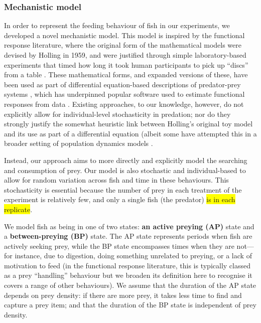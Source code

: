 \documentclass[ASNA,twocolumn]{USG} %
\begin{document}
\subsubsection{Mechanistic model}
In order to represent the feeding behaviour of fish in our experiments, we developed a novel mechanistic model. This model is inspired by the functional response literature, where the original form of the mathematical models were devised by Holling in 1959, and were justified through simple laboratory-based experiments that timed how long it took human participants to pick up ``discs'' from a table \citep{hollingCharacteristicsSimpleTypes1959}. These mathematical forms, and expanded versions of these, have been used as part of differential equation-based descriptions of predator-prey systems \citep{rosenbaumFittingFunctionalResponses2018a}, which has underpinned popular software used to estimate functional responses from data \citep[e.g.][]{pritchardFrairPackageFitting2017}. Existing approaches, to our knowledge, however, do not explicitly allow for individual-level stochasticity in predation; nor do they strongly justify the somewhat heuristic link between Holling's original toy model and its use as part of a differential equation (albeit some have attempted this in a broader setting of population dynamics models \citep{dawesDerivationHollingsType2013}.

Instead, our approach aims to more directly and explicitly model the searching and consumption of prey. Our model is also stochastic and individual-based to allow for random variation across fish and time in these behaviours. This stochasticity is essential because the number of prey in each treatment of the experiment is relatively few, and only a single fish (the predator) \colorbox{yellow}{is in each replicate}.

We model fish as being in one of two states: \textbf{an active preying (AP)} state and a \textbf{between-preying (BP)} state. The AP state represents periods when fish are actively seeking prey, while the BP state encompasses times when they are not—for instance, due to digestion, doing something unrelated to preying, or a lack of motivation to feed (in the functional response literature, this is typically classed as a prey ``handling'' behaviour but we broaden its definition here to recognise it covers a range of other behaviours). We assume that the duration of the AP state depends on prey density: if there are more prey, it takes less time to find and capture a prey item; and that the duration of the BP state is independent of prey density.
\end{document}
